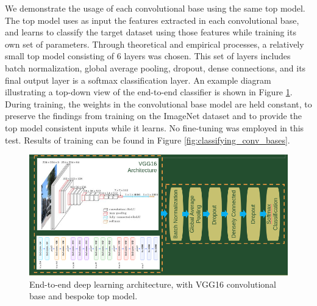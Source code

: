 We demonstrate the usage of each convolutional base using the same top model.
The top model uses as input the features extracted in each convolutional base, and learns to classify the target dataset using those features while training its own set of parameters.
Through theoretical and empirical processes, a relatively small top model consisting of 6 layers was chosen.
This set of layers includes batch normalization, global average pooling, dropout, dense connections, and its final output layer is a softmax classification layer.
An example diagram illustrating a top-down view of the end-to-end classifier is shown in Figure \ref{fig:classifying_architecture}.
During training, the weights in the convolutional base model are held constant, to preserve the findings from training on the ImageNet dataset and to provide the top model consistent inputs while it learns.
No fine-tuning was employed in this test.
Results of training can be found in Figure \ref{fig:classifying_conv_bases}.

\begin{figure}
	\includegraphics[width=\textwidth]{./thesis_code/vgg16_top_model.png}
	\caption{End-to-end deep learning architecture, with VGG16 convolutional base and bespoke top model.}
	\label{fig:classifying_architecture}
\end{figure}

